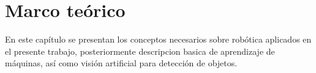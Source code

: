 \chapter{Marco teórico} \label{chap:marco_teorico}

\vspace{5 mm}

En este capítulo se presentan los conceptos necesarios sobre robótica aplicados en el presente trabajo, posteriormente descripcion basica de aprendizaje de máquinas, así como visión artificial para detección de objetos.
